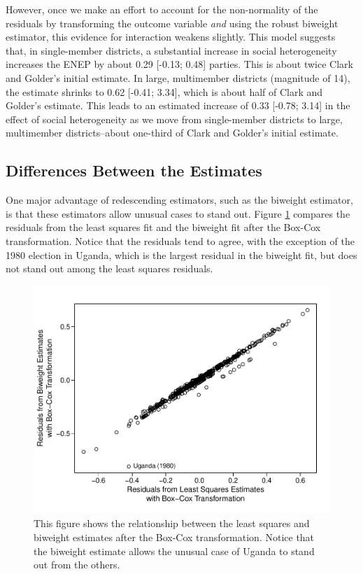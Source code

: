 \documentclass[12pt]{article}
\begin{document}
However, once we make an effort to account for the non-normality of the residuals by transforming the outcome variable \textit{and} using the robust biweight estimator, this evidence for interaction weakens slightly. 
This model suggests that, in single-member districts, a substantial increase in social heterogeneity increases the ENEP by about 0.29 [-0.13; 0.48] parties. 
This is about twice Clark and Golder's initial estimate.
In large, multimember districts (magnitude of 14), the estimate shrinks to 0.62 [-0.41; 3.34], which is about half of Clark and Golder's estimate. 
This leads to an estimated increase of 0.33 [-0.78; 3.14] in the effect of social heterogeneity as we move from single-member districts to large, multimember districts--about one-third of Clark and Golder's initial estimate.

\subsection*{Differences Between the Estimates}

One major advantage of redescending estimators, such as the biweight estimator, is that these estimators allow unusual cases to stand out. 
Figure \ref{fig:cg-residuals-compare} compares the residuals from the least squares fit and the biweight fit after the Box-Cox transformation. 
Notice that the residuals tend to agree, with the exception of the 1980 election in Uganda, which is the largest residual in the biweight fit, but does not stand out among the least squares residuals.

\begin{figure}[h!]
\begin{center}
\includegraphics[scale = 0.6]{figs/cg-residuals-compare.pdf}
\caption{This figure shows the relationship between the least squares and biweight estimates after the Box-Cox transformation. 
Notice that the biweight estimate allows the unusual case of Uganda to stand out from the others.}\label{fig:cg-residuals-compare}
\end{center}
\end{figure}
\end{document}
